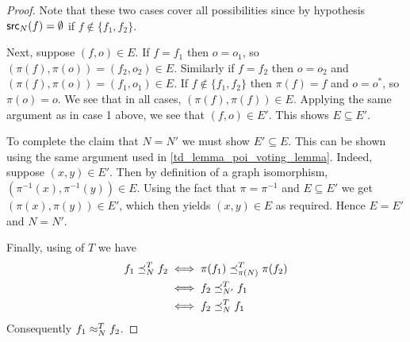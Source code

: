 \begin{proof}
Note that these two cases cover all possibilities since by hypothesis
$\mathsf{src}_{N}(f) = \emptyset$ if $f \notin \{f_1, f_2\}$.

Next, suppose $(f, o) \in E$. If $f = f_1$ then $o = o_1$, so $(\pi(f),
\pi(o)) = (f_2, o_2) \in E$. Similarly if $f = f_2$ then $o = o_2$ and
$(\pi(f), \pi(o)) = (f_1, o_1) \in E$. If $f \notin \{f_1, f_2\}$ then $\pi(f)
= f$ and $o = o^*$, so $\pi(o) = o$. We see that in all cases, $(\pi(f),
\pi(f)) \in E$. Applying the same argument as in case 1 above, we see that
$(f, o) \in E'$. This shows $E \subseteq E'$.

To complete the claim that $N = N'$ we must show $E' \subseteq E$. This can be
shown using the same argument used in \cref{td_lemma_poi_voting_lemma}.
Indeed, suppose $(x, y) \in E'$. Then by definition of a graph isomorphism,
$(\pi^{-1}(x), \pi^{-1}(y)) \in E$. Using the fact that $\pi=\pi^{-1}$
and $E \subseteq E'$ we get $(\pi(x), \pi(y)) \in E'$, which then yields $(x,
y) \in E$ as required. Hence $E = E'$ and $N = N'$.

Finally, using \symmetry{} of $T$ we have
\begin{align*}
    f_1 \preceq_N^T f_2 & \iff
    \pi(f_1) \preceq_{\pi(N)}^T \pi(f_2) \\ & \iff
    f_2 \preceq_{N'}^T f_1 \\ & \iff
    f_2 \preceq_N^T f_1
\end{align*}
Consequently $f_1 \approx_N^T f_2$.
\end{proof}

